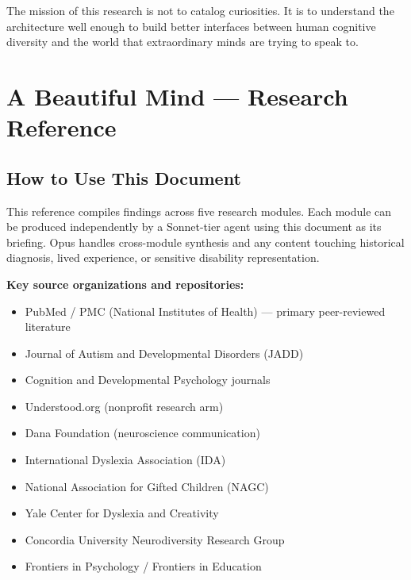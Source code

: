 \documentclass[11pt,letterpaper]{article}
\newcommand{\stageheader}[2]{%
  \noindent\colorbox{#2}{\makebox[\textwidth][l]{%
    \textcolor{white}{\bfseries\sffamily\hspace{6pt}#1\hspace{6pt}}}}%
  \vspace{0.5em}\par%
}
\begin{document}
The mission of this research is not to catalog curiosities. It is to understand the architecture well enough to build better interfaces between human cognitive diversity and the world that extraordinary minds are trying to speak to.

\newpage
\stageheader{STAGE 2 --- RESEARCH REFERENCE}{secondary}

\section{A Beautiful Mind --- Research Reference}

\subsection{How to Use This Document}

This reference compiles findings across five research modules. Each module can be produced independently by a Sonnet-tier agent using this document as its briefing. Opus handles cross-module synthesis and any content touching historical diagnosis, lived experience, or sensitive disability representation.

\textbf{Key source organizations and repositories:}
\begin{itemize}[leftmargin=*]
  \item PubMed / PMC (National Institutes of Health) --- primary peer-reviewed literature
  \item Journal of Autism and Developmental Disorders (JADD)
  \item Cognition and Developmental Psychology journals
  \item Understood.org (nonprofit research arm)
  \item Dana Foundation (neuroscience communication)
  \item International Dyslexia Association (IDA)
  \item National Association for Gifted Children (NAGC)
  \item Yale Center for Dyslexia and Creativity
  \item Concordia University Neurodiversity Research Group
  \item Frontiers in Psychology / Frontiers in Education
\end{itemize}
\end{document}
